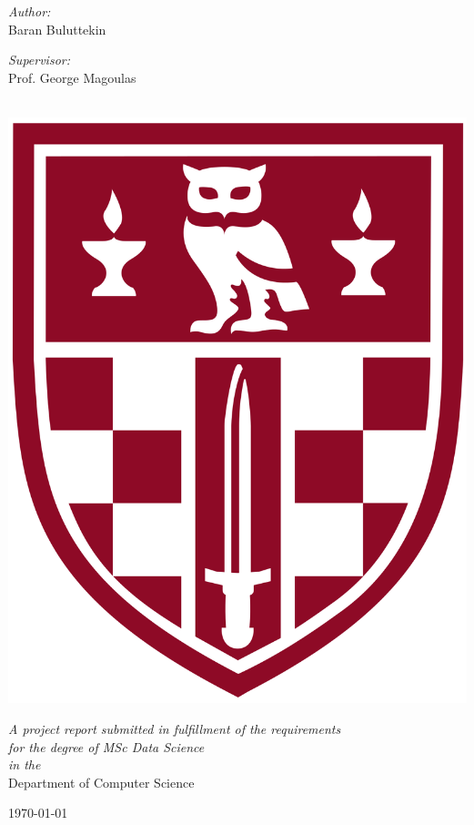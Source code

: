 \documentclass[12pt, twoside, a4paper, openright]{report}
\begin{document}
\begin{titlepage}
\begin{center}
        \begin{minipage}[t]{0.4\textwidth}
        \begin{flushleft} \large
        \emph{Author:}\\
        {Baran Buluttekin}
        \end{flushleft}
        \end{minipage}
        \begin{minipage}[t]{0.4\textwidth}
        \begin{flushright} \large
        \emph{Supervisor:} \\
        {Prof. George Magoulas} 
        \end{flushright}
        \end{minipage}\\
        [2cm] 
        \includegraphics[scale=0.05]{img/birkbeck-shield.png}
            \vfill

            \large \textit{A project report submitted in fulfillment of the requirements\\ for the degree of MSc Data Science}\\[0.3cm] 
            \textit{in the}\\[0.4cm]
            Department of Computer Science\\[2cm] 
 
            \vfill

            {\large \today}\\[4cm] 
 
            \vfill
    \end{center}
\end{titlepage}    
\thispagestyle{empty}
\cleardoublepage
\end{document}

